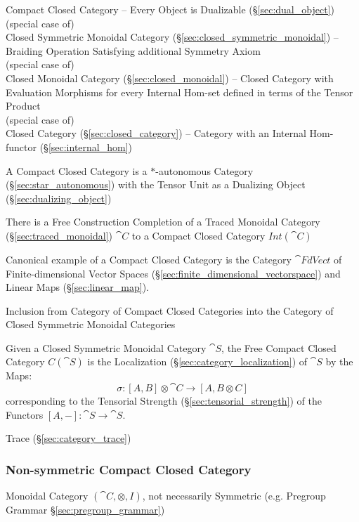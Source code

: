 Compact Closed Category -- Every Object is Dualizable
(\S\ref{sec:dual_object}) \\
(special case of) \\
Closed Symmetric Monoidal Category
(\S\ref{sec:closed_symmetric_monoidal})
-- Braiding Operation Satisfying additional Symmetry Axiom \\
(special case of) \\
Closed Monoidal Category (\S\ref{sec:closed_monoidal}) -- Closed
Category with Evaluation Morphisms for every Internal Hom-set defined
in terms of the Tensor Product \\
(special case of) \\
Closed Category (\S\ref{sec:closed_category}) -- Category with an
Internal Hom-functor (\S\ref{sec:internal_hom})

A Compact Closed Category is a $*$-autonomous Category
(\S\ref{sec:star_autonomous}) with the Tensor Unit as a Dualizing
Object (\S\ref{sec:dualizing_object})

There is a Free Construction Completion of a Traced Monoidal Category
(\S\ref{sec:traced_monoidal}) $\cat{C}$ to a Compact Closed Category
$Int(\cat{C})$

Canonical example of a Compact Closed Category is the Category
$\cat{FdVect}$ of Finite-dimensional Vector Spaces
(\S\ref{sec:finite_dimensional_vectorspace}) and Linear Maps
(\S\ref{sec:linear_map}).

Inclusion from Category of Compact Closed Categories into the Category
of Closed Symmetric Monoidal Categories

Given a Closed Symmetric Monoidal Category $\cat{S}$, the Free Compact
Closed Category $C(\cat{S})$ is the Localization
(\S\ref{sec:category_localization}) of $\cat{S}$ by the Maps:
\[
  \sigma:[A,B] \otimes \cat{C} \rightarrow [A,B \otimes C]
\]
corresponding to the Tensorial Strength
(\S\ref{sec:tensorial_strength}) of the Functors $[A,-]: \cat{S}
\rightarrow \cat{S}$.

Trace (\S\ref{sec:category_trace})



\subsubsection{Non-symmetric Compact Closed Category}
\label{sec:nonsymmetric_compact_closed}

Monoidal Category $(\cat{C}, \otimes, I)$, not necessarily Symmetric
(e.g. Pregroup Grammar \S\ref{sec:pregroup_grammar})

